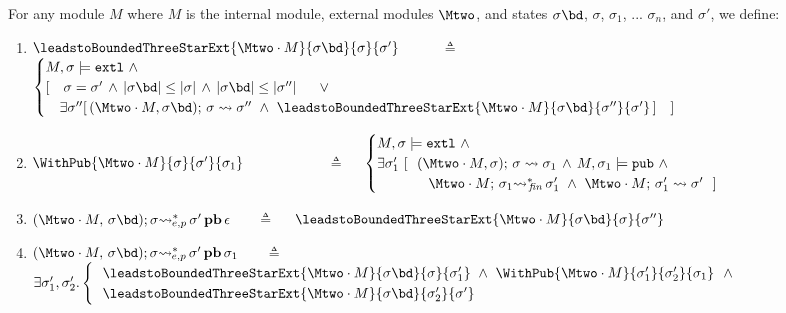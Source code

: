 \begin{definition}
\label{def:exec:sum}
For any module $M$  where $M$ is the internal module, external modules $\Mtwo$, and states $\sigma\bd$,  $\sigma$,  $\sigma_1$, ... $\sigma_n$, and $\sigma'$, we define:

\begin{enumerate}

\item
 ${\leadstoBoundedThreeStarExt {\Mtwo\cdot M} {\sigma\bd}  {\sigma}  {\sigma'}}$ \ \ \ \ \   $\triangleq$ \ \ 
$
\begin{cases}
M, \sigma  \models  \extThis\  \wedge\  \\
[ \ \ \ 
\sigma=\sigma' \, \wedge\,  \EarlierS  {\sigma\bd}  {\sigma} \, \wedge\,  \EarlierS  {\sigma\bd}  {\sigma''}\ \ \ \ \ \vee\\
\ \ \ \exists \sigma''[\,  \leadstoBoundedThree {\Mtwo\cdot M} {\sigma}  {\sigma\bd}   {\sigma''} \  \wedge\  
{\leadstoBoundedThreeStarExt {\Mtwo\cdot M} {\sigma\bd}  {\sigma''}  {\sigma'}}\, ] \ \ \ ]
\end{cases}
$

\item
${\WithPub {\Mtwo\cdot M}    {\sigma}  {\sigma'} {\sigma_1}}$ \  \ \  \ \ \ \ \ \ \ \ $\triangleq$ \ \ 
$\begin{cases}
M, \sigma  \models \extThis \ \wedge \\
\exists   \sigma_1'\ [ \ \   \leadstoBoundedThree  {\Mtwo\cdot M} {\sigma} {\sigma}  {\sigma_{1}}\, \wedge\,  M, \sigma_1 \models \pubMeth \ \wedge \\ 
\strut \ \ \ \ \  \ \ \ \ \ \   \leadstoBoundedStarFin {\Mtwo\cdot M} {\sigma_1}  {\sigma_1'}  \ \wedge \   \leadstoBounded  {\Mtwo\cdot M} {\sigma_1'}      {\sigma'} \ \ ] 
\end{cases}
$

\item
$\WithExtPub {\Mtwo\cdot M} {\sigma\bd}  {\sigma}  {\sigma'} {\epsilon}$ \ \      \  $\triangleq$ \ \ 
$\leadstoBoundedThreeStarExt {\Mtwo\cdot M} {\sigma\bd}  {\sigma}  {\sigma''}$

\item
\label{four:defg23a}
$\WithExtPub {\Mtwo\cdot M} {\sigma\bd}  {\sigma}  {\sigma'} {\sigma_1}$  \ \ \  $\triangleq$ \ \ 
$\exists \sigma_1',\sigma_2'.  
\begin{cases}
 \ \   {\leadstoBoundedThreeStarExt {\Mtwo\cdot M} {\sigma\bd}  {\sigma}  {\sigma_1'}}\ \wedge\ 
{\WithPub {\Mtwo\cdot M}    {\sigma_1'}  {\sigma_2'} {\sigma_1}}  \ \ \wedge \\
 \ \  {\leadstoBoundedThreeStarExt {\Mtwo\cdot M} {\sigma\bd}  {\sigma_2'}  {\sigma'}}   \\
  \end{cases}$


\end{enumerate}
\end{definition}
